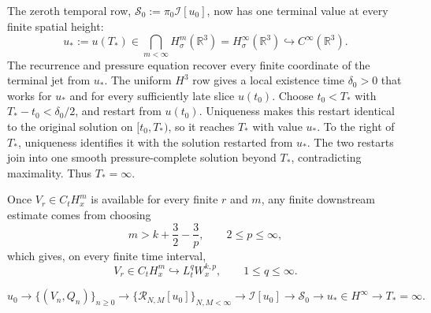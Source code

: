 The zeroth temporal row, \(\mathscr S_0:=\pi_0\mathcal I[u_0]\), now has one
terminal value at every finite spatial height:
\[
u_*:=u(T_*)
\in\bigcap_{m<\infty}H^m_\sigma(\mathbb R^3)
=H^\infty_\sigma(\mathbb R^3)
\hookrightarrow C^\infty(\mathbb R^3).
\]
The recurrence and pressure equation recover every finite coordinate of the
terminal jet from \(u_*\). The uniform \(H^3\) row gives a local existence time
\(\delta_0>0\) that works for \(u_*\) and for every sufficiently late slice
\(u(t_0)\). Choose \(t_0<T_*\) with \(T_*-t_0<\delta_0/2\), and restart from
\(u(t_0)\). Uniqueness makes this restart identical to the original solution
on \([t_0,T_*)\), so it reaches \(T_*\) with value \(u_*\). To the right of
\(T_*\), uniqueness identifies it with the solution restarted from \(u_*\).
The two restarts join into one smooth pressure-complete solution beyond
\(T_*\), contradicting maximality. Thus \(T_*=\infty\).

Once \(V_r\in C_tH_x^m\) is available for every finite \(r\) and \(m\), any
finite downstream estimate comes from choosing
\[
m>k+\frac32-\frac3p,
\qquad
2\le p\le\infty,
\]
which gives, on every finite time interval,
\[
V_r\in C_tH_x^m
\hookrightarrow L_t^qW_x^{k,p},
\qquad 1\le q\le\infty.
\]

\[
u_0
\longrightarrow \{(V_n,Q_n)\}_{n\ge0}
\longrightarrow \{\mathcal R_{N,M}[u_0]\}_{N,M<\infty}
\longrightarrow \mathcal I[u_0]
\longrightarrow \mathscr S_0
\longrightarrow u_*\in H^\infty
\longrightarrow T_*=\infty.
\]
